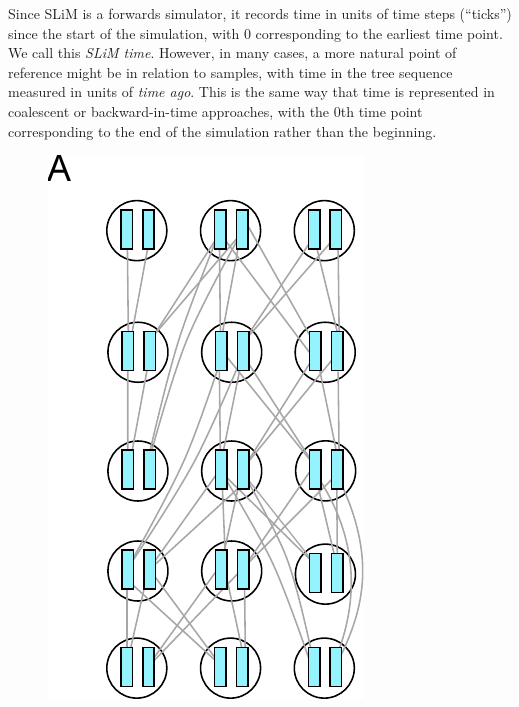 \documentclass[12pt]{article}
\begin{document}
Since SLiM is a forwards simulator, it records time in units of time steps (``ticks'')
since the start of the simulation, with 0 corresponding to the earliest time point.
We call this \textit{SLiM time}.
However, in many cases, a more natural point of reference might be in relation to samples, with
time in the tree sequence measured in units of \textit{time ago}. This is the same way that time
is represented in coalescent or backward-in-time approaches, with the 0th time point corresponding
to the end of the simulation rather than the beginning.

\begin{figure}
\centering
    \includegraphics{figures/pedigree0}

\end{figure}
\end{document}
